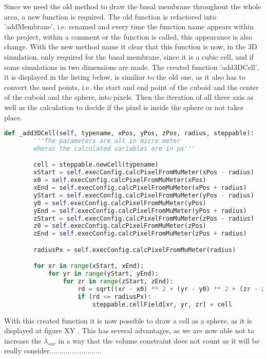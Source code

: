 Since we need the old method to draw the basal membrane throughout the whole area, a new function is required. The old function is refactored into 'addMembrane', i.e. renamed and every time the function name appears within the project, within a comment or the function is called, this appearance is also change. With the new method name it clear that this function is now, in the 3D simulation, only required for the basal membrane, since it is a cubic cell, and if some simulations in two dimensions are made.\newline
The created function 'add3DCell', it is displayed in the listing below, is similiar to the old one, as it also has to convert the used points, i.e. the start and end point of the cuboid and the center of the cuboid and the sphere, into pixels. Then the iteration of all three axis as well as the calculation to decide if the pixel is inside the sphere or not takes place.

\begin{lstlisting}[language=Python, caption = created method to draw a spere cell]
    def _add3DCell(self, typename, xPos, yPos, zPos, radius, steppable):
        '''The parameters are all in micro meter
        wheras the calculated variables are in px'''

        cell = steppable.newCell(typename)
        xStart = self.execConfig.calcPixelFromMuMeter(xPos - radius)
        x0 = self.execConfig.calcPixelFromMuMeter(xPos)
        xEnd = self.execConfig.calcPixelFromMuMeter(xPos + radius)
        yStart = self.execConfig.calcPixelFromMuMeter(yPos - radius)
        y0 = self.execConfig.calcPixelFromMuMeter(yPos)
        yEnd = self.execConfig.calcPixelFromMuMeter(yPos + radius)
        zStart = self.execConfig.calcPixelFromMuMeter(zPos - radius)
        z0 = self.execConfig.calcPixelFromMuMeter(zPos)
        zEnd = self.execConfig.calcPixelFromMuMeter(zPos + radius)

        radiusPx = self.execConfig.calcPixelFromMuMeter(radius)

        for xr in range(xStart, xEnd):
            for yr in range(yStart, yEnd):
                for zr in range(zStart, zEnd):
                    rd = sqrt((xr - x0) ** 2 + (yr - y0) ** 2 + (zr - z0) ** 2)
                    if (rd <= radiusPx):
                        steppable.cellField[xr, yr, zr] = cell
\end{lstlisting}

With this created function it is now possible to draw a cell as a sphere, as it is displayed at figure XY \cite{XY}. This has several advantages, as we are now able not to increase the $\lambda_{sur}$ in a way that the volume constraint does not count as it will be really consider..........................

